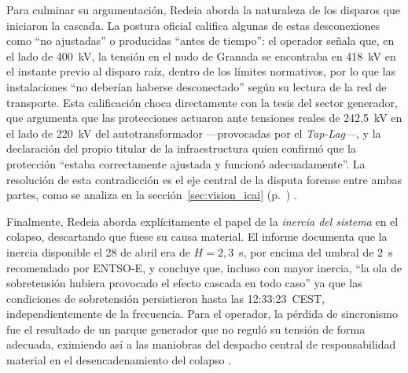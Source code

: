 Para culminar su argumentación, Redeia aborda la naturaleza de los
disparos que iniciaron la cascada. La postura oficial califica algunas
de estas desconexiones como ``no ajustadas'' o producidas ``antes de
tiempo'': el operador señala que, en el lado de 400~kV, la tensión en el
nudo de Granada se encontraba en 418~kV en el instante previo al disparo
raíz, dentro de los límites normativos, por lo que las instalaciones
``no deberían haberse desconectado'' según su lectura de la red de
transporte. Esta calificación choca directamente con la tesis del sector
generador, que argumenta que las protecciones actuaron ante tensiones
reales de 242,5~kV en el lado de 220~kV del autotransformador
---provocadas por el \textit{Tap-Lag}---, y la declaración del propio titular de la
infraestructura quien confirmó que la protección ``estaba correctamente
ajustada y funcionó adecuadamente''. La resolución de esta contradicción
es el eje central de la disputa forense entre ambas partes, como se
analiza en la sección~\ref{sec:vision_icai}
(p.~\pageref{sec:vision_icai}) \cite{icai2025,ree2025}.

Finalmente, Redeia aborda explícitamente el papel de la \textit{inercia
del sistema} en el colapso, descartando que fuese su causa material. El
informe documenta que la inercia disponible el 28 de abril era de
$H = 2,3$~s, por encima del umbral de 2~s recomendado por ENTSO-E, y
concluye que, incluso con mayor inercia, ``la ola de sobretensión hubiera
provocado el efecto cascada en todo caso'' ya que las condiciones de
sobretensión persistieron hasta las 12:33:23~CEST, independientemente de
la frecuencia. Para el operador, la pérdida de sincronismo fue el
resultado de un parque generador que no reguló su tensión de forma
adecuada, eximiendo así a las maniobras del despacho central de
responsabilidad material en el desencadenamiento del colapso
\cite{ree2025}.


